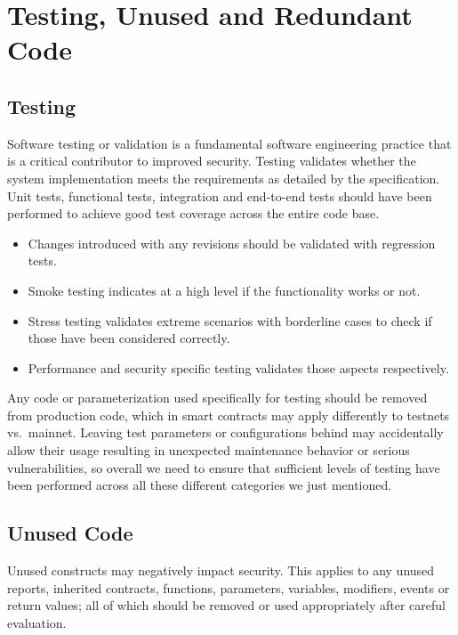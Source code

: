 \section{Testing, Unused and Redundant
Code}\label{testing-unused-and-redundant-code}

\subsection{Testing}\label{testing}

Software testing or validation is a fundamental software engineering
practice that is a critical contributor to improved security. Testing
validates whether the system implementation meets the requirements as
detailed by the specification. Unit tests, functional tests, integration
and end-to-end tests should have been performed to achieve good test
coverage across the entire code base.

\begin{itemize}
\tightlist
\item
  Changes introduced with any revisions should be validated with
  regression tests.
\item
  Smoke testing indicates at a high level if the functionality works or
  not.
\item
  Stress testing validates extreme scenarios with borderline cases to
  check if those have been considered correctly.
\item
  Performance and security specific testing validates those aspects
  respectively.
\end{itemize}

Any code or parameterization used specifically for testing should be
removed from production code, which in smart contracts may apply
differently to testnets vs.~mainnet. Leaving test parameters or
configurations behind may accidentally allow their usage resulting in
unexpected maintenance behavior or serious vulnerabilities, so overall
we need to ensure that sufficient levels of testing have been performed
across all these different categories we just mentioned.

\subsection{Unused Code}\label{unused-code}

Unused constructs may negatively impact security. This applies to any
unused reports, inherited contracts, functions, parameters, variables,
modifiers, events or return values; all of which should be removed or
used appropriately after careful evaluation.

